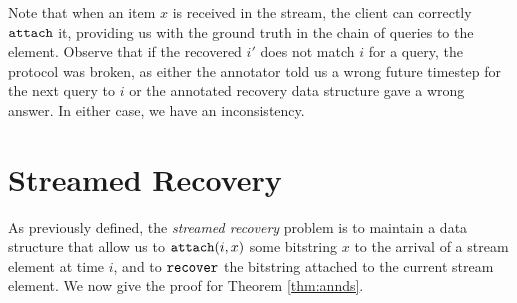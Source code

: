     


    Note that when an item $x$ is received in the stream, the client can correctly $\mathtt{attach}$ it, providing us with the ground truth in the chain of queries to the element. Observe that if the recovered $i'$ does not match $i$ for a query, the protocol was broken, as either the annotator told us a wrong future timestep for the next query to $i$ or the annotated recovery data structure gave a wrong answer. In either case, we have an inconsistency.


\section{Streamed Recovery}
    As previously defined, the \emph{streamed recovery} problem is to maintain a data structure that allow us to $\mathtt{attach}(i, x)$ some bitstring $x$ to the arrival of a stream element at time $i$, and to $\mathtt{recover}$ the bitstring attached to the current stream element. We now give the proof for Theorem \ref{thm:annds}.

